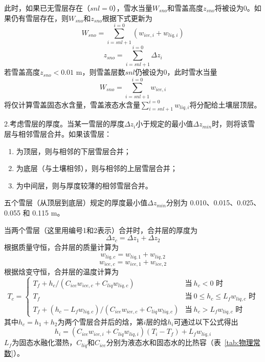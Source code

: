 此时，如果已无雪层存在（$snl=0$），雪水当量$W_{sno}$和雪盖高度$z_{sno}$将被设为0。如果仍有雪层存在，则$W_{sno}$和$z_{sno}$根据下式更新为
\begin{equation}
    W_{sno} = \sum_{i=snl+1}^{i=0}\left(w_{ice,i}+w_{liq,i}\right)
\end{equation}
\begin{equation}
    z_{sno} = \sum_{i=snl+1}^{i=0} \Delta z_i
\end{equation}
若雪盖高度$z_{sno} < 0.01$ \unit{m}，则雪盖层数$snl$仍被设为0，此时雪水当量
$$W_{sno}=\sum_{i=snl+1}^{i=0} w_{ice,i}$$
将仅计算雪盖固态水含量，雪盖液态水含量$\sum_{i=snl+1}^{i=0} w_{liq,i}$将分配给土壤层顶层。

2.考虑雪层的厚度。当某一雪层的厚度$\Delta z_i$小于规定的最小值$\Delta z_{min}$时，则将该雪层与相邻雪层合并。如果该雪层：
\begin{enumerate}
\item 为顶层，则与相邻的下层雪层合并；
\item 为底层（与土壤相邻），则与相邻的上层雪层合并；
\item 为中间层，则与厚度较薄的相邻雪层合并。
\end{enumerate}

五个雪层（从顶层到底层）规定的厚度最小值$\Delta z_{min}$分别为 0.010、0.015、0.025、0.055 和 0.115 \unit{m}。

当两个雪层（这里用编号1和2表示）合并时，合并层的厚度为
\begin{equation}\label{eq:SnowCombThick}
\Delta {z}_c=\Delta {z}_{1}+\Delta {z}_{2}
\end{equation}
根据质量守恒，合并层的质量计算为
\begin{equation}
w_{liq,c}=w_{liq,1}+w_{liq,2}
\end{equation}
\begin{equation}
w_{ice,c}=w_{ice,1}+w_{ice,2}
\end{equation}
根据焓变守恒，合并层的温度计算为
\begin{equation}\label{eq:SnowCombTemp}
T_c=\begin{cases}
    T_f+{h_c}/\left(C_{ice}w_{ice,c}+C_{liq}w_{liq,c}\right) &\text{当}\ h_c<0 \text{ 时} \\
    T_f &\text{当}\ 0 \leqslant h_c \leqslant L_f w_{liq,c} \text{ 时}\\
    T_f+\left(h_c-L_f w_{liq,c}\right)/\left(C_{ice} w_{ice,c}+C_{liq} w_{liq,c}\right) &\text{当}\ h_c > L_f w_{liq,c} \text{ 时}
\end{cases}
\end{equation}
其中$h_c=h_1+h_2$为两个雪层合并后的焓，第$i$层的焓$h_i$可通过以下公式得出
\begin{equation}
    h_i=\left(C_{ice}w_{ice,i}+C_{liq}w_{liq,i}\right)\left(T_i-T_f\right)+L_fw_{liq,i}
\end{equation}
$L_f$为固态水融化潜热，$C_{liq}$和$C_{ice}$分别为液态水和固态水的比热容（表~\ref{tab:物理常数}）。

